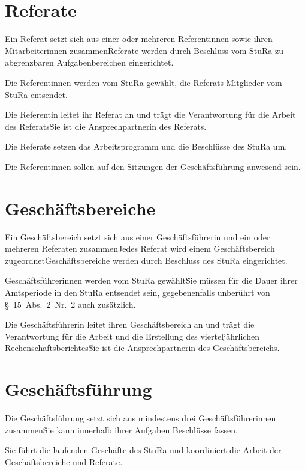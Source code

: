 \begin{multicols}{2}
\section{Referate} %

\Abs \Satz Ein Referat setzt sich aus einer oder mehreren Referentinnen sowie ihren Mitarbeiterinnen zusammen\. Referate werden durch Beschluss vom StuRa zu abgrenzbaren Aufgabenbereichen eingerichtet.

\Abs \Satz Die Referentinnen werden vom StuRa gewählt, die Referats-Mitglieder vom StuRa entsendet.

\Abs \Satz Die Referentin leitet ihr Referat an und trägt die Verantwortung für die Arbeit des Referats\. Sie ist die Ansprechpartnerin des Referats.

\Abs \Satz Die Referate setzen das Arbeitsprogramm und die Beschlüsse des StuRa um.

\Abs \Satz Die Referentinnen sollen auf den Sitzungen der Geschäftsführung anwesend sein.



\section{Geschäftsbereiche}

\Abs \Satz Ein Geschäftsbereich setzt sich aus einer Geschäftsführerin und ein oder mehreren Referaten zusammen\. Jedes Referat wird einem Geschäftsbereich zugeordnet\. Geschäftsbereiche werden durch Beschluss des StuRa eingerichtet.

\Abs \Satz Geschäftsführerinnen werden vom StuRa gewählt\. Sie müssen für die Dauer ihrer Amtsperiode in den StuRa entsendet sein, gegebenenfalls unberührt von §~15~Abs.~2~Nr.~2 auch zusätzlich.

\Abs \Satz Die Geschäftsführerin leitet ihren Geschäftsbereich an und trägt die Verantwortung für die Arbeit und die Erstellung des vierteljährlichen Rechenschaftsberichtes\. Sie ist die Ansprechpartnerin des Geschäftsbereichs.



\section{Geschäftsführung}

\Abs \Satz Die Geschäftsführung setzt sich aus mindestens drei Geschäftsführerinnen zusammen\. Sie kann innerhalb ihrer Aufgaben Beschlüsse fassen.

\Abs \Satz Sie führt die laufenden Geschäfte des StuRa und koordiniert die Arbeit der Geschäftsbereiche und Referate.


\end{multicols}
